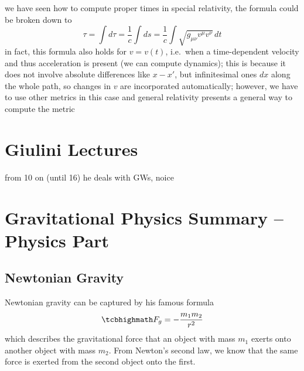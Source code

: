 we have seen how to compute proper times in special relativity, the formula could be broken down to 
\begin{equation}
\tau = \int d\tau = \frac{1}{c} \int ds = \frac{1}{c} \int \sqrt{g_{\mu \nu} v^\mu v^\nu} \, dt
\end{equation}
in fact, this formula also holds for $v = v(t)$, i.e.~when a time-dependent velocity and thus acceleration is present (we can compute dynamics); this is because it does not involve absolute differences like $x - x'$, but infinitesimal ones $dx$ along the whole path, so changes in $v$ are incorporated automatically; however, we have to use other metrics in this case and general relativity presents a general way to compute the metric



\newpage



	\section{Giulini Lectures}
from 10 on (until 16) he deals with GWs, noice



\newpage



	\section{Gravitational Physics Summary -- Physics Part}



		\subsection{Newtonian Gravity}
Newtonian gravity can be captured by his famous formula
\begin{equation}
\eqbox{
F_g = - \frac{m_1 m_2}{r^2}
}
\end{equation}
which describes the gravitational force that an object with mass $m_1$ exerts onto another object with mass $m_2$. From Newton's second law, we know that the same force is exerted from the second object onto the first.



